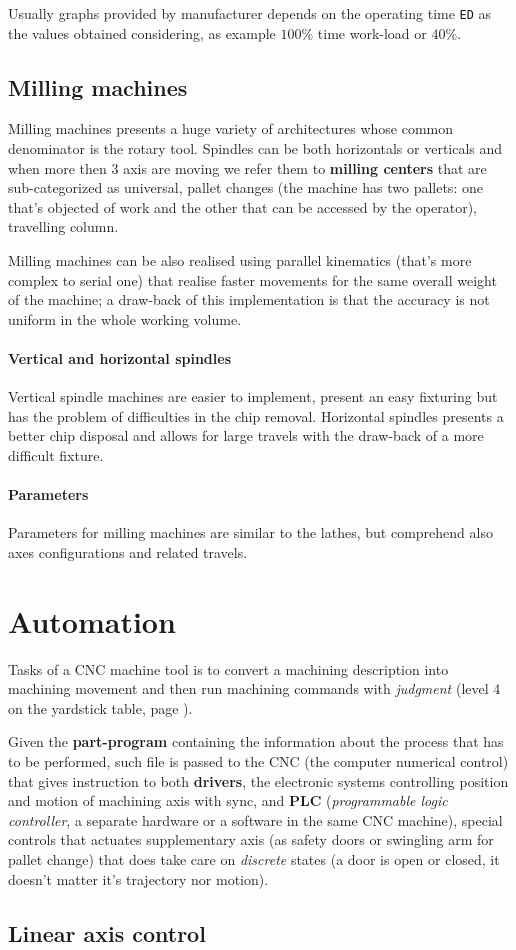 		Usually graphs provided by manufacturer depends on the operating time \texttt{ED} as the values obtained considering, as example $100\%$ time work-load or $40\%$.
		
	\subsection{Milling machines}
		Milling machines presents a huge variety of architectures whose common denominator is the rotary tool. Spindles can be both horizontals or verticals and when more then 3 axis are moving we refer them to \textbf{milling centers} that are sub-categorized as  universal, pallet changes (the machine has two pallets: one that's objected of work and the other that can be accessed by the operator), travelling column. 
		
		Milling machines can be also realised using parallel kinematics (that's more complex to serial one) that realise faster movements for the same overall weight of the machine; a draw-back of this implementation is that the accuracy is not uniform in the whole working volume.
		
		\paragraph{Vertical and horizontal spindles} Vertical spindle machines are easier to implement, present an easy fixturing but has the problem of difficulties in the chip removal. Horizontal spindles presents a better chip disposal and allows for large travels with the draw-back of a more difficult fixture.
		
		\paragraph{Parameters} Parameters for milling machines are similar to the lathes, but comprehend also axes configurations and related travels.
		
\section{Automation}
	Tasks of a CNC machine tool is to convert a machining description into machining movement and then run machining commands with \textit{judgment} (level 4 on the yardstick table, page \pageref{tab:ind:amber}).
	
	Given the \textbf{part-program} containing the information about the process that has to be performed, such file is passed to the CNC (the computer numerical control) that gives instruction to both \textbf{drivers}, the electronic systems controlling position and motion of machining axis with sync, and \textbf{PLC} (\textit{programmable logic controller}, a separate hardware or a software in the same CNC machine), special controls that actuates supplementary axis (as safety doors or swingling arm for pallet change) that does take care on \textit{discrete} states (a door is open or closed, it doesn't matter it's trajectory nor motion).
	
	\subsection*{Linear axis control}
		
		
		
		
		
		
		
		
		
		
